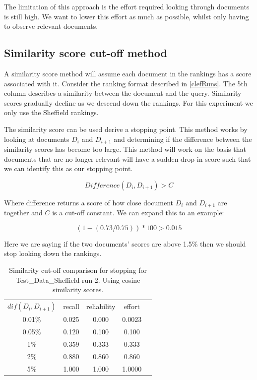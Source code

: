 The limitation of this approach is the effort required looking through documents is still high. We want to lower this effort as much as possible, whilst only having to observe relevant documents.


\subsection{Similarity score cut-off method} \label{simScoreMethod}

A similarity score method will assume each document in the rankings has a score associated with it. Consider the ranking format described in \ref{clefRuns}. The 5th column describes a similarity between the document and the query. Similarity scores gradually decline as we descend down the rankings. For this experiment we only use the Sheffield rankings.

The similarity score can be used derive a stopping point. This method works by looking at documents $D_i$ and $D_{i+1}$ and determining if the difference between the similarity scores has become too large. This method will work on the basis that documents that are no longer relevant will have a sudden drop in score such that we can identify this as our stopping point.

\begin{equation}
	  Difference(D_i, D_{i+1}) > C
\end{equation}

Where difference returns a score of how close document $D_i$ and $D_{i+1}$ are together and $C$ is a cut-off constant. We can expand this to an example:

\begin{equation}
	  (1 -(0.73 / 0.75)) * 100 > 0.015
\end{equation}

Here we are saying if the two documents' scores are above 1.5\% then we should stop looking down the rankings.


\begin{table}[H]
\centering
\begin{tabular}{|c|c|c|c|c|} 
\hline
 $dif(D_i, D_{i+1})$ & recall & reliability & effort  \\ 
 0.01\% & 0.025 &	0.000	&	0.0023 \\ 
 0.05\% & 0.120 &	0.100	&	0.100 \\ 
 1\% & 0.359 &	0.333	&	0.333 \\ 
 2\% & 0.880 &	0.860	&	0.860 \\ 
 5\% & 1.000 &	1.000	&	1.0000 \\ 
 \hline
\end{tabular}

\caption{Similarity cut-off comparison for stopping for Test\_Data\_Sheffield-run-2. Using cosine similarity scores.}
\end{table}

